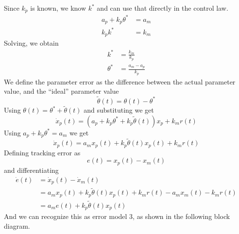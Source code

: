 \begin{example}
  Since $k_{p}$ is known, we know $k^{*}$ and can use that directly in the control law.
  \begin{align*}
    a_{p}+k_{p}\theta^{*}&=a_{m} \\
    k_{p}k^{*}&=k_{m}
  \end{align*}
  Solving, we obtain
  \begin{align*}
    k^{*}&=\frac{k_{m}}{k_{p}} \\
    \theta^{*}&=\frac{a_{m}-a_{p}}{k_{p}}
  \end{align*}
  We define the parameter error as the difference between the actual parameter value, and the ``ideal'' parameter value
  \begin{equation*}
    \tilde{\theta}(t)=\theta(t)-\theta^{*}
  \end{equation*}
  Using $\theta(t)=\theta^{*}+\tilde{\theta}(t)$ and substituting we get
  \begin{equation*}
    \dot{x}_{p}(t)=(a_{p}+k_{p}\theta^{*}+k_{p}\tilde{\theta}(t))x_{p}+k_{m}r(t)
  \end{equation*}
  Using $a_{p}+k_{p}\theta^{*}=a_{m}$ we get
  \begin{equation*}
    \dot{x}_{p}(t)=a_{m}x_{p}(t)+k_{p}\tilde{\theta}(t)x_{p}(t)+k_{m}r(t)
  \end{equation*}
  Defining tracking error as
  \begin{equation*}
    e(t)=x_{p}(t)-x_{m}(t)
  \end{equation*}
  and differentiating
  \begin{align*}
    \dot{e}(t)&=\dot{x}_{p}(t)-\dot{x}_{m}(t) \\
    &=a_{m}x_{p}(t)+k_{p}\tilde{\theta}(t)x_{p}(t)+k_{m}r(t)-a_{m}x_{m}(t)-k_{m}r(t) \\
    &=a_{m}e(t)+k_{p}\tilde{\theta}(t)x_{p}(t)
  \end{align*}
  And we can recognize this as error model 3, as shown in the following block diagram.
  \begin{center}
\end{center}
\end{example}
